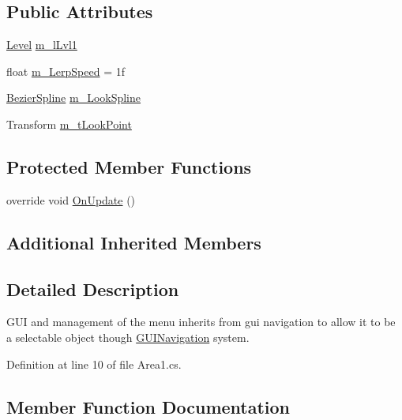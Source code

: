 \subsection*{Public Attributes}
\begin{DoxyCompactItemize}
\item 
\mbox{\hyperlink{class_level}{Level}} \mbox{\hyperlink{class_area1_a8d69d7173c24501c807a8c01e7579085}{m\+\_\+l\+Lvl1}}
\item 
float \mbox{\hyperlink{class_area1_a2f8e8916829e951428da6cad8b8e0bef}{m\+\_\+\+Lerp\+Speed}} = 1f
\item 
\mbox{\hyperlink{class_bezier_spline}{Bezier\+Spline}} \mbox{\hyperlink{class_area1_a656bd1b3723ae1ace1ccba171b6fe178}{m\+\_\+\+Look\+Spline}}
\item 
Transform \mbox{\hyperlink{class_area1_ae1cb617dc149937706a5d595ee200391}{m\+\_\+t\+Look\+Point}}
\end{DoxyCompactItemize}
\subsection*{Protected Member Functions}
\begin{DoxyCompactItemize}
\item 
override void \mbox{\hyperlink{class_area1_a036218e5cf822f13d2e923e0e1100ecf}{On\+Update}} ()
\end{DoxyCompactItemize}
\subsection*{Additional Inherited Members}


\subsection{Detailed Description}
G\+UI and management of the menu inherits from gui navigation to allow it to be a selectable object though \mbox{\hyperlink{class_g_u_i_navigation}{G\+U\+I\+Navigation}} system. 



Definition at line 10 of file Area1.\+cs.



\subsection{Member Function Documentation}
\mbox{\label{class_area1_abe3e9544cd582f84468323ec7d254d32}} 
